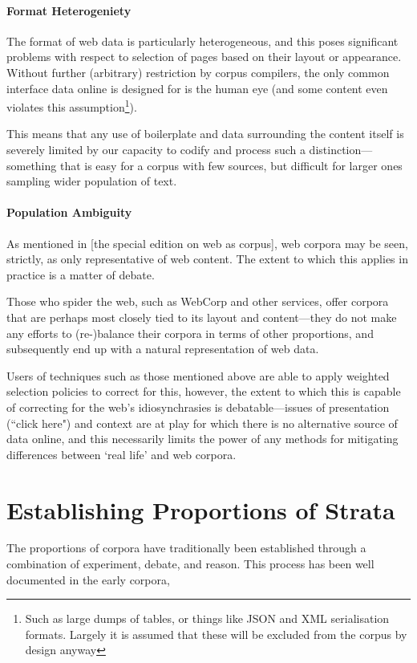 \paragraph{Format Heterogeniety}
The format of web data is particularly heterogeneous, and this poses significant problems with respect to selection of pages based on their layout or appearance.  Without further (arbitrary) restriction by corpus compilers, the only common interface data online is designed for is the human eye (and some content even violates this assumption\footnote{Such as large dumps of tables, or things like JSON and XML serialisation formats.  Largely it is assumed that these will be excluded from the corpus by design anyway}).  

This means that any use of boilerplate and data surrounding the content itself is severely limited by our capacity to codify and process such a distinction---something that is easy for a corpus with few sources, but difficult for larger ones sampling wider population of text.

\paragraph{Population Ambiguity}
As mentioned in [the special edition on web as corpus], web corpora may be seen, strictly, as only representative of web content.  The extent to which this applies in practice is a matter of debate.

Those who spider the web, such as WebCorp and other services, offer corpora that are perhaps most closely tied to its layout and content---they do not make any efforts to (re-)balance their corpora in terms of other proportions, and subsequently end up with a natural representation of web data.

Users of techniques such as those mentioned above are able to apply weighted selection policies to correct for this, however, the extent to which this is capable of correcting for the web's idiosynchrasies is debatable---issues of presentation (``click here") and context are at play for which there is no alternative source of data online, and this necessarily limits the power of any methods for mitigating differences between `real life' and web corpora. %


\section{Establishing Proportions of Strata}
The proportions of corpora have traditionally been established through a combination of experiment, debate, and reason.  This process has been well documented in the early corpora, 


